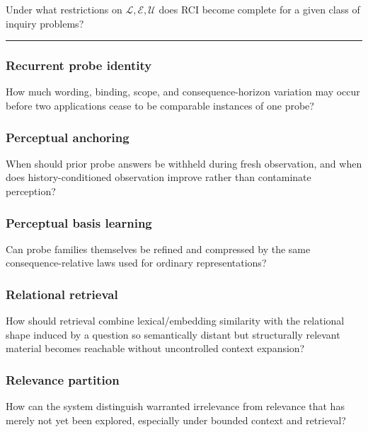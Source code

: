 \documentclass[
]{article}
\begin{document}
Under what restrictions on \(\mathcal L,\mathcal E,\mathcal U\) does RCI
become complete for a given class of inquiry problems?

\begin{center}\rule{0.5\linewidth}{0.5pt}\end{center}


\subsubsection{Recurrent probe identity}\label{recurrent-probe-identity}

How much wording, binding, scope, and consequence-horizon variation may occur
before two applications cease to be comparable instances of one probe?

\subsubsection{Perceptual anchoring}\label{perceptual-anchoring}

When should prior probe answers be withheld during fresh observation, and when
does history-conditioned observation improve rather than contaminate
perception?

\subsubsection{Perceptual basis learning}\label{perceptual-basis-learning}

Can probe families themselves be refined and compressed by the same
consequence-relative laws used for ordinary representations?

\subsubsection{Relational retrieval}\label{relational-retrieval}

How should retrieval combine lexical/embedding similarity with the relational
shape induced by a question so semantically distant but structurally relevant
material becomes reachable without uncontrolled context expansion?

\subsubsection{Relevance partition}\label{relevance-partition}

How can the system distinguish warranted irrelevance from relevance that has
merely not yet been explored, especially under bounded context and retrieval?
\end{document}
